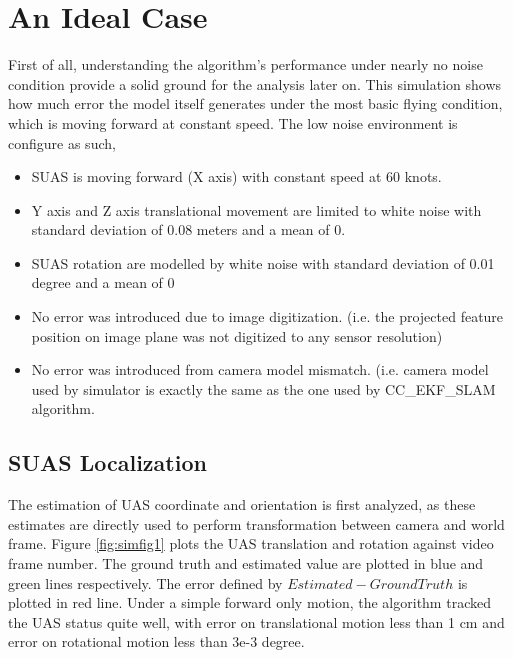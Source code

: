 \section{An Ideal Case}
First of all, understanding the algorithm's performance under nearly
no noise condition provide a solid ground for the analysis later on.
This simulation shows how much error the model itself generates under
the most basic flying condition, which is moving forward at constant
speed. The low noise environment is configure as such,

\begin{itemize}
  \item SUAS is moving forward (X axis) with constant speed at 60 knots. 
  \item Y axis and Z axis translational movement are limited to white
  noise with standard deviation of 0.08 meters and a mean of 0.
  \item SUAS rotation are modelled by white noise with standard
  deviation of 0.01 degree and a mean of 0
  \item No error was introduced due to image digitization. (i.e. the
  projected feature position on image plane was not digitized to any
  sensor resolution)
  \item No error was introduced from camera model mismatch. (i.e.
  camera model used by simulator is exactly the same as the one used
  by CC\_EKF\_SLAM algorithm.
\end{itemize}

\subsection{SUAS Localization}
The estimation of UAS coordinate and orientation is first analyzed, as 
these estimates are directly used to perform transformation between 
camera and world frame. Figure \ref{fig:simfig1} plots the UAS 
translation and rotation against video frame number. The ground truth 
and estimated value are plotted in blue and green lines respectively. 
The error defined by $Estimated-Ground Truth$ is plotted in red line. 
Under a simple forward only motion, the algorithm tracked the UAS status 
quite well, with error on translational motion less than 1 cm and error 
on rotational motion less than 3e-3 degree. 

